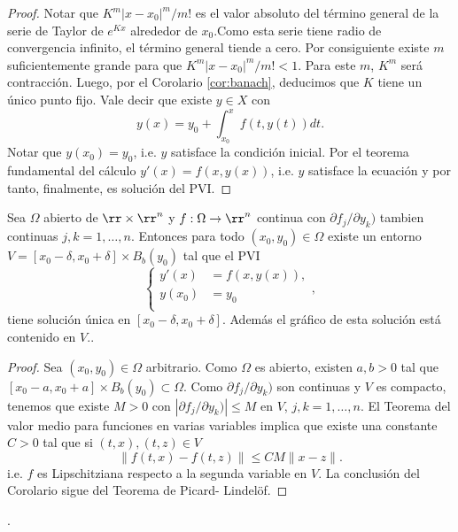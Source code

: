 \begin{proof}
Notar que $K^m|x-x_0|^m/m!$ es el valor absoluto del término general de la serie de Taylor de $e^{Kx}$ alrededor de $x_0$.Como esta serie tiene radio de convergencia infinito, el término general tiende a cero. Por consiguiente existe $m$ suficientemente grande para que $K^m|x-x_0|^m/m!<1$. Para este $m$, $K^m$ será contracción. Luego, por el Corolario \ref{cor:banach},  deducimos que $K$ tiene un único punto fijo. Vale decir que existe $y\in X$ con
\[
 y(x)=y_0+\int_{x_0}^xf(t,y(t))dt.
\]
Notar que $y(x_0)=y_0$, i.e. $y$ satisface la condición inicial. Por el teorema fundamental del cálculo $y'(x)=f(x,y(x))$, i.e. $y$ satisface la ecuación y por tanto, finalmente, es solución del PVI.\end{proof}


\begin{corolario}{} Sea $\Omega$ abierto de $\rr\times \rr^n$ y $f:\Omega\to\rr^n$ continua con $\partial f_j/\partial y_k)$ tambien continuas $j,k=1,\ldots,n$. Entonces para todo $(x_0,y_0)\in\Omega$ existe un entorno $V=[x_0-\delta,x_0+\delta]\times B_b(y_0)$ tal que el PVI
 \[
 \left\{\begin{array}{ll}
	  y'(x)&=f(x,y(x)),\\
	  y(x_0)&=y_0\\         
        \end{array}
\right. ,
\]
tiene solución única en $[x_0-\delta,x_0+\delta]$. Además el gráfico de esta solución está contenido en $V$..
\end{corolario}

\begin{proof} Sea $(x_0,y_0)\in\Omega$ arbitrario. Como $\Omega$ es abierto, existen $a,b>0$ tal que $[x_0-a,x_0+a]\times B_b(y_0)\subset \Omega$. Como $\partial f_j/\partial y_k)$ son continuas y $V$ es compacto, tenemos que existe $M>0$ con $|\partial f_j/\partial y_k)|\leq M$ en $V$, $j,k=1,\ldots,n$. El Teorema del valor medio para funciones en varias variables implica que existe una constante $C>0$ tal que si $(t,x),(t,z)\in V$
\[\|f(t,x)-f(t,z)\|\leq C M\|x-z\|.\]
i.e. $f$ es Lipschitziana respecto a la segunda variable en $V$. La conclusión del Corolario sigue del Teorema de Picard- Lindelöf. 
\end{proof}


   
\nocite{JorgeSotomayor513}.




  
  